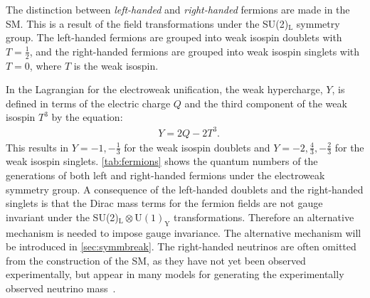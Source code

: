 The distinction between \emph{left-handed} and \emph{right-handed} fermions are made in the SM. This is a result of the field transformations under the SU(2)$_\mathrm{L}$ symmetry group. The left-handed fermions are grouped into weak isospin doublets with $T = \frac{1}{2}$, and the right-handed fermions are grouped into weak isospin singlets with $T = 0$, where $T$ is the weak isospin. 

In the Lagrangian for the electroweak unification, the weak hypercharge, $Y$, is defined in terms of the electric charge $Q$ and the third component of the weak isospin $T^3$ by the equation:
\begin{equation}
    \label{eq:hypercharge}
    \begin{aligned}
        & Y = 2Q - 2T^3.
    \end{aligned}
\end{equation}
This results in $Y = -1, -\frac{1}{3}$ for the weak isospin doublets and $Y = -2,\frac{4}{3},-\frac{2}{3}$ for the weak isospin singlets. \cref{tab:fermions} shows the quantum numbers of the generations of both left and right-handed fermions under the electroweak symmetry group. A consequence of the left-handed doublets and the right-handed singlets is that the Dirac mass terms for the fermion fields are not gauge invariant under the SU(2)$_\mathrm{L} \otimes \mathrm{U}(1)_\mathrm{Y}$ transformations. Therefore an alternative mechanism is needed to impose gauge invariance. The alternative mechanism will be introduced in \cref{sec:symmbreak}. The right-handed neutrinos are often omitted from the construction of the SM, as they have not yet been observed experimentally, but appear in many models for generating the experimentally observed neutrino mass~\cite{Ahmad2002}.

